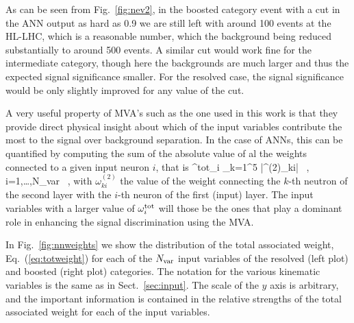 As can be seen from Fig.~\ref{fig:nev2}, in the boosted category
event with a cut in the ANN output as hard as 0.9 we are still left
with around 100 events at the HL-LHC, which is a reasonable number,
which the background being reduced substantially to around
500 events.
%
A similar cut would work fine for the intermediate category, though here
the backgrounds are much larger and thus the expected signal significance smaller.
%
For the resolved case, the signal significance would be only slightly
improved for any value of the cut.

A very useful property of MVA's such as the one used in this work
is that they provide direct  physical insight about which of the
input variables contribute the most to the signal over background
separation.
%
In the case of ANNs, this can be quantified by computing the sum
of the absolute value of al the weights connected to a given
input neuron $i$, that is
\be
\label{eq:totweight}
\omega^{\rm tot}_i \equiv \sum_{k=1}^5 \Big|\omega^{(2)}_{ki}\Big| \, ,
\qquad i=1,\ldots,N_{\rm var} \, ,
\ee
with $\omega^{(2)}_{ki}$ the value of the weight connecting
the $k$-th neutron of the second layer with the $i$-th neuron of
the first (input) layer.
%
The input variables with a larger value of $\omega^{\rm tot}_i$ will those
be the ones that play a dominant role in enhancing the signal
discrimination using the MVA.

%
In Fig.~\ref{fig:nnweights} we show
the distribution of the total associated weight,
Eq.~(\ref{eq:totweight}) for each of the $N_{\rm var}$ input
variables of the resolved (left plot) and boosted (right plot) categories.
%
The notation for the various kinematic variables is the same
as in Sect.~\ref{sec:input}.
%
The scale of the $y$ axis is arbitrary, and the important information
is contained in the relative strengths of the total associated weight
for each of the input variables.



